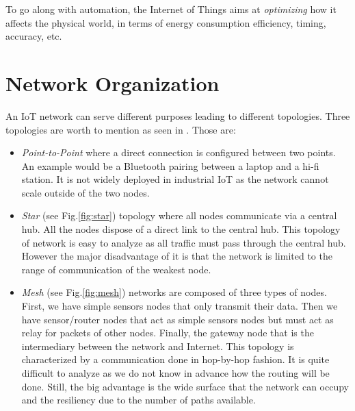 To go along with automation, the Internet of Things aims at \textit{optimizing} how it affects the physical world, in terms of energy consumption efficiency, timing, accuracy, etc.

\section{Network Organization}

An IoT network can serve different purposes leading to different topologies. Three topologies are worth to mention as seen in \cite{website:3topo}. Those are:
\begin{itemize}
  \item \textit{Point-to-Point} where a direct connection is configured between two points. An example would be a Bluetooth pairing between a laptop and a hi-fi station. It is not widely deployed in industrial IoT as the network cannot scale outside of the two nodes.
  \item \textit{Star} (see Fig.\ref{fig:star}) topology where all nodes communicate via a central hub. All the nodes dispose of a direct link to the central hub. This topology of network is easy to analyze as all traffic must pass through the central hub. However the major disadvantage of it is that the network is limited to the range of communication of the weakest node.
  \item \textit{Mesh} (see Fig.\ref{fig:mesh}) networks are composed of three types of nodes. First, we have simple sensors nodes that only transmit their data. Then we have sensor/router nodes that act as simple sensors nodes but must act as relay for packets of other nodes. Finally, the gateway node that is the intermediary between the network and Internet. This topology is characterized by a communication done in hop-by-hop fashion. It is quite difficult to analyze as we do not know in advance how the routing will be done. Still, the big advantage is the wide surface that the network can occupy and the resiliency due to the number of paths available.\\
\end{itemize}

